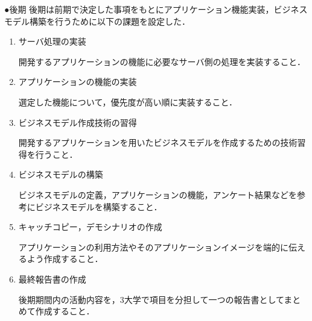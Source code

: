 ●後期
後期は前期で決定した事項をもとにアプリケーション機能実装，ビジネスモデル構築を行うために以下の課題を設定した．
\begin{enumerate}
\item サーバ処理の実装
\par 開発するアプリケーションの機能に必要なサーバ側の処理を実装すること．
\item アプリケーションの機能の実装
\par 選定した機能について，優先度が高い順に実装すること．
\item ビジネスモデル作成技術の習得
\par 開発するアプリケーションを用いたビジネスモデルを作成するための技術習得を行うこと．
\item ビジネスモデルの構築
\par ビジネスモデルの定義，アプリケーションの機能，アンケート結果などを参考にビジネスモデルを構築すること．
\item キャッチコピー，デモシナリオの作成
\par アプリケーションの利用方法やそのアプリケーションイメージを端的に伝えるよう作成すること．
\item 最終報告書の作成
\par 後期期間内の活動内容を，3大学で項目を分担して一つの報告書としてまとめて作成すること．
\end{enumerate}
